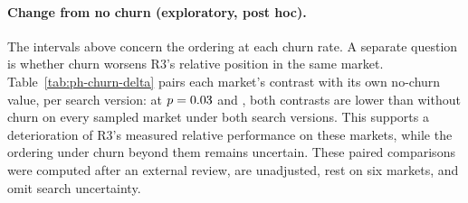 \documentclass[11pt]{article}
\begin{document}
\paragraph{Change from no churn (exploratory, post hoc).} The intervals above concern the ordering at each churn rate. A separate question is whether churn worsens R3's relative position in the same market. Table~\ref{tab:ph-churn-delta} pairs each market's contrast with its own no-churn value, per search version: at $p = 0.03$ and , both contrasts are lower than without churn on every sampled market under both search versions. This supports a deterioration of R3's measured relative performance on these markets, while the ordering under churn beyond them remains uncertain. These paired comparisons were computed after an external review, are unadjusted, rest on six markets, and omit search uncertainty.
\end{document}

